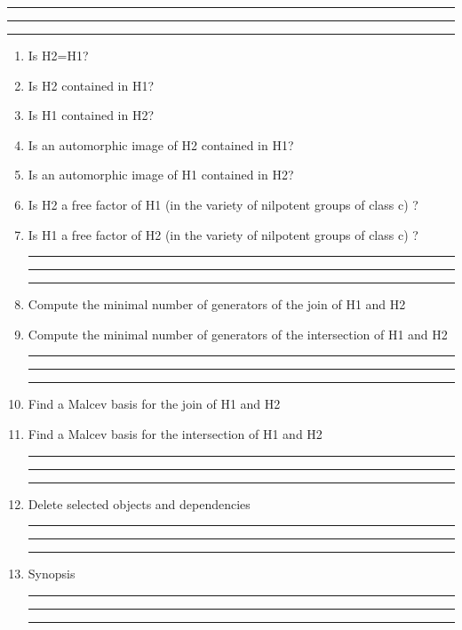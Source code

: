 
\bigskip
\hrule\hrule\hrule

\begin{enumerate}

\item Is H2=H1?

\item Is H2 contained in H1?

\item Is H1 contained in H2?

\item Is an automorphic image of H2 contained in H1?

\item Is an automorphic image of H1 contained in H2?

\item Is H2 a free factor of H1 (in the variety of nilpotent groups of class c) ?

\item Is H1 a free factor of H2 (in the variety of nilpotent groups of class c) ?

\bigskip
\hrule\hrule\hrule

\item Compute the minimal number of generators of the join of H1 and H2

\item Compute the minimal number of generators of the intersection of H1 and H2

\bigskip
\hrule\hrule\hrule

\item Find a Malcev basis for the join of H1 and H2

\item Find a Malcev basis for the intersection of H1 and H2

\bigskip
\hrule\hrule\hrule

\item Delete selected objects and dependencies

\bigskip
\hrule\hrule\hrule

\item
Synopsis

\bigskip
\hrule\hrule\hrule

\end{enumerate}
